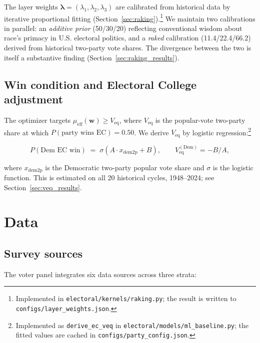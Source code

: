 \documentclass[12pt, letterpaper]{article}
\theoremstyle{definition}
\newcommand{\mueff}{\mu_{\mathrm{eff}}}
\newcommand{\Veq}{V_{\mathrm{eq}}}
\newcommand{\lambdaone}{\lambda_1}
\newcommand{\lambdatwo}{\lambda_2}
\newcommand{\lambdathree}{\lambda_3}
\newcommand{\boldw}{\mathbf{w}}
\begin{document}
The layer weights $\boldsymbol{\lambda} = (\lambdaone, \lambdatwo, \lambdathree)$
are calibrated from historical data by iterative proportional fitting
(Section~\ref{sec:raking}).\footnote{Implemented in
\texttt{electoral/kernels/raking.py}; the result is written to
\texttt{configs/layer\_weights.json}.} We maintain two calibrations in parallel: an
\textit{additive prior} (50/30/20) reflecting conventional wisdom about race's
primacy in U.S. electoral politics, and a \textit{raked} calibration
(11.4/22.4/66.2) derived from historical two-party vote shares. The divergence
between the two is itself a substantive finding (Section~\ref{sec:raking_results}).

\subsection{Win condition and Electoral College adjustment}
\label{sec:veq}

The optimizer targets $\mueff(\boldw) \geq \Veq$, where $\Veq$ is the
popular-vote two-party share at which $P(\text{party wins EC}) = 0.50$. We
derive $\Veq$ by logistic regression:\footnote{Implemented as
\texttt{derive\_ec\_veq} in \texttt{electoral/models/ml\_baseline.py}; the
fitted values are cached in \texttt{configs/party\_config.json}.}

\begin{equation}
  P(\text{Dem EC win}) \;=\;
    \sigma\!\left(A \cdot x_{\text{dem2p}} + B\right),
  \qquad
  \Veq^{(\text{Dem})} = -B/A,
  \label{eq:veq}
\end{equation}

where $x_{\text{dem2p}}$ is the Democratic two-party popular vote share and
$\sigma$ is the logistic function. This is estimated on all 20 historical
cycles, 1948--2024; see Section~\ref{sec:veq_results}.

\section{Data}
\label{sec:data}

\subsection{Survey sources}

The voter panel integrates six data sources across three strata:
\end{document}
